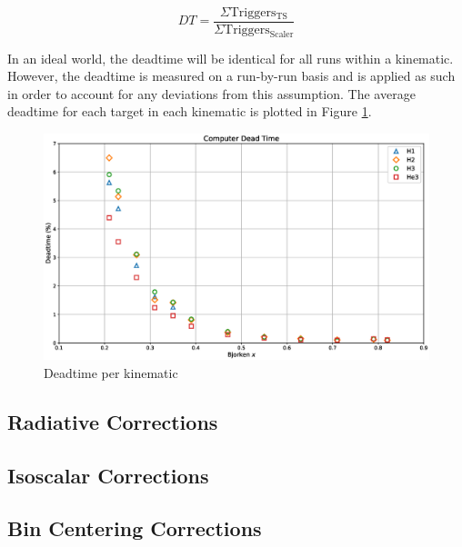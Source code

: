 \begin{equation}
DT = \frac{\Sigma \mathrm{Triggers_{TS}}}{\Sigma \mathrm{Triggers_{Scaler}}}
\end{equation}

In an ideal world, the deadtime will be identical for all runs within a kinematic. However, the deadtime is measured on a run-by-run basis and is applied as such in order to account for any deviations from this assumption. The average deadtime for each target in each kinematic is plotted in Figure \ref{fig:deadtime}.

\begin{figure}
	\includegraphics[width=\textwidth]{./analysis/fig/deadtime.eps}
	\caption{Deadtime per kinematic}
	\label{fig:deadtime}
\end{figure}

\subsection{Radiative Corrections}

\subsection{Isoscalar Corrections}

\subsection{Bin Centering Corrections}


